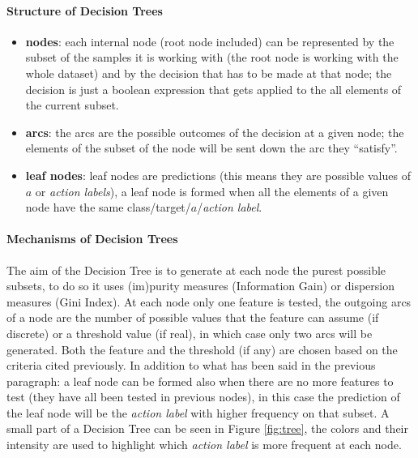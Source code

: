\paragraph{Structure of Decision Trees}
\begin{itemize}
 \item \textbf{nodes}: each internal node (root node included) can be represented by the subset of the samples it is working with (the root node is working with the whole dataset) and by the decision that has to be made at that node; the decision is just a boolean expression that gets applied to the all elements of the current subset. 
 \item \textbf{arcs}: the arcs are the possible outcomes of the decision at a given node; the elements of the subset of the node will be sent down the arc they ``satisfy''.
 \item \textbf{leaf nodes}: leaf nodes are predictions (this means they are possible values of $a$ or \textit{action labels}), a leaf node is formed when all the elements of a given node have the same class/target/$a$/\textit{action label}.
\end{itemize}

\paragraph{Mechanisms of Decision Trees}
The aim of the Decision Tree is to generate at each node the purest possible subsets, to do so it uses (im)purity measures (Information Gain) or dispersion measures (Gini Index). At each node only one feature is tested, the outgoing arcs of a node are the number of possible values that the feature can assume (if discrete) or a threshold value (if real), in which case only two arcs will be generated. Both the feature and the threshold (if any) are chosen based on the criteria cited previously. In addition to what has been said in the previous paragraph: a leaf node can be formed also when there are no more features to test (they have all been tested in previous nodes), in this case the prediction of the leaf node will be the \textit{action label} with higher frequency on that subset. A small part of a Decision Tree can be seen in Figure \ref{fig:tree}, the colors and their intensity are used to highlight which \textit{action label} is more frequent at each node.

